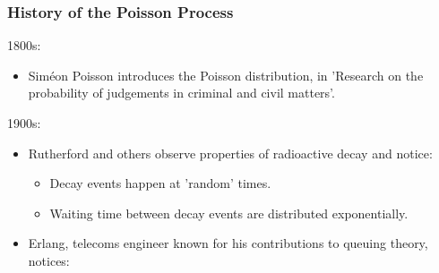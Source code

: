 \documentclass{beamer}
\begin{document}
\begin{frame}
  \frametitle{History of the Poisson Process}
  1800s:
  \begin{itemize}
  \item Siméon Poisson introduces the Poisson distribution, in 'Research on the probability of judgements in criminal and civil matters'.
  \pause
  \pause\pause\pause\pause\pause
    \end{itemize}
  \pause
  1900s:
  \begin{itemize}
    \item Rutherford and others observe properties of radioactive decay and notice:
    \begin{itemize}
    \item Decay events happen at 'random' times.
    \item Waiting time between decay events are distributed exponentially.
    \end{itemize}
  \item Erlang, telecoms engineer known for his contributions to queuing theory, notices:

\end{itemize}
\end{frame}
\end{document}
